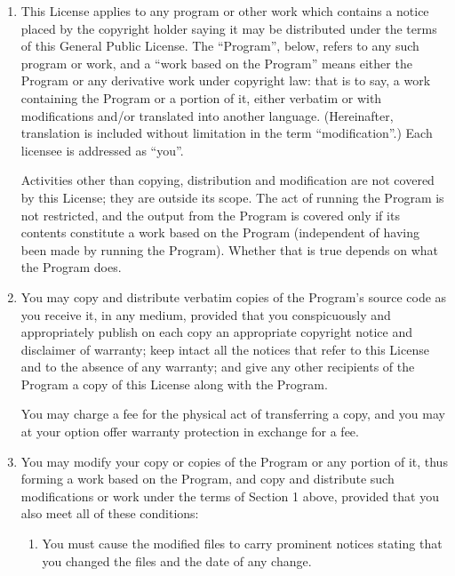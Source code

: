 \begin{enumerate}

\addtocounter{enumi}{-1}

\item 
This License applies to any program or other work which contains a notice
placed by the copyright holder saying it may be distributed under the
terms of this General Public License.  The ``Program'', below, refers to
any such program or work, and a ``work based on the Program'' means either
the Program or any derivative work under copyright law: that is to say, a
work containing the Program or a portion of it, either verbatim or with
modifications and/or translated into another language.  (Hereinafter,
translation is included without limitation in the term ``modification''.)
Each licensee is addressed as ``you''.

Activities other than copying, distribution and modification are not
covered by this License; they are outside its scope.  The act of
running the Program is not restricted, and the output from the Program
is covered only if its contents constitute a work based on the
Program (independent of having been made by running the Program).
Whether that is true depends on what the Program does.

\item You may copy and distribute verbatim copies of the Program's source
  code as you receive it, in any medium, provided that you conspicuously
  and appropriately publish on each copy an appropriate copyright notice
  and disclaimer of warranty; keep intact all the notices that refer to
  this License and to the absence of any warranty; and give any other
  recipients of the Program a copy of this License along with the Program.

You may charge a fee for the physical act of transferring a copy, and you
may at your option offer warranty protection in exchange for a fee.

\item
You may modify your copy or copies of the Program or any portion
of it, thus forming a work based on the Program, and copy and
distribute such modifications or work under the terms of Section 1
above, provided that you also meet all of these conditions:

\begin{enumerate}

\item 
You must cause the modified files to carry prominent notices stating that
you changed the files and the date of any change.


\end{enumerate}
\end{enumerate}
